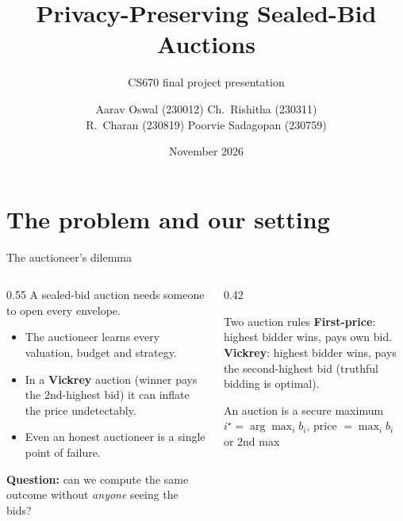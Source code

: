 \documentclass[aspectratio=169,11pt]{beamer}
\title{Privacy-Preserving Sealed-Bid Auctions}
\subtitle{CS670 final project presentation}
\author{Aarav Oswal (230012) \quad Ch.\ Rishitha (230311)\\R.\ Charan (230819) \quad Poorvie Sadagopan (230759)}
\institute{CSE, IIT Kanpur}
\date{November 2026}
\begin{document}
\maketitle

\section{The problem and our setting}

\begin{frame}{The auctioneer's dilemma}
  \begin{columns}[T]
    \begin{column}{0.55\textwidth}
      A sealed-bid auction needs someone to \alert{open every envelope}.
      \begin{itemize}
        \item The auctioneer learns every valuation, budget and strategy.
        \item In a \textbf{Vickrey} auction (winner pays the 2nd-highest bid) it can
              inflate the price undetectably.
        \item Even an honest auctioneer is a single point of failure.
      \end{itemize}
      \medskip
      \textbf{Question:} can we compute the same outcome without \emph{anyone} seeing the bids?
    \end{column}
    \begin{column}{0.42\textwidth}
      \begin{block}{Two auction rules}
        \textbf{First-price}: highest bidder wins, pays own bid.\\[4pt]
        \textbf{Vickrey}: highest bidder wins, pays the second-highest bid
        (truthful bidding is optimal).
      \end{block}
      \begin{exampleblock}{An auction is a secure maximum}
        $i^\star = \arg\max_i b_i$, \quad price $= \max_i b_i$ or 2nd max
      \end{exampleblock}
    \end{column}
  \end{columns}
\end{frame}
\end{document}
